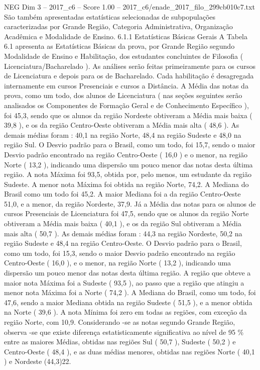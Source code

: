 \begin{textsample}{NEG Dim 3 – 2017\_c6 – Score 1.00 – 2017\_c6/enade\_2017\_filo\_299cb010c7.txt}
São também apresentadas estatísticas selecionadas de subpopulações caracterizadas por Grande Região, Categoria Administrativa, Organização Acadêmica e Modalidade de Ensino. 6.1.1 Estatísticas Básicas Gerais A Tabela 6.1 apresenta as Estatísticas Básicas da prova, por Grande Região segundo Modalidade de Ensino e Habilitação, dos estudantes concluintes de Filosofia ( Licenciatura/Bacharelado ).
As análises serão feitas primeiramente para os cursos de Licenciatura e depois para os de Bacharelado.
Cada habilitação é desagregada internamente em cursos Presenciais e cursos a Distância.
A Média das notas da prova, como um todo, dos alunos de Licenciatura ( nas seções seguintes serão analisados os Componentes de Formação Geral e de Conhecimento Específico ), foi 45,3, sendo que os alunos da região Nordeste obtiveram a Média mais baixa ( 39,8 ), e os da região Centro-Oeste obtiveram a Média mais alta ( 48,6 ).
As demais médias foram : 40,1 na região Norte, 48,4 na região Sudeste e 48,0 na região Sul.
O Desvio padrão para o Brasil, como um todo, foi 15,7, sendo o maior Desvio padrão encontrado na região Centro-Oeste ( 16,0 ) e o menor, na região Norte ( 13,2 ), indicando uma dispersão um pouco menor das notas desta última região.
A nota Máxima foi 93,5, obtida por, pelo menos, um estudante da região Sudeste.
A menor nota Máxima foi obtida na região Norte, 74,2.
A Mediana do Brasil como um todo foi 45,2.
A maior Mediana foi a da região Centro-Oeste 51,0, e a menor, da região Nordeste, 37,9.
Já a Média das notas para os alunos de cursos Presenciais de Licenciatura foi 47,5, sendo que os alunos da região Norte obtiveram a Média mais baixa ( 40,1 ), e os da região Sul obtiveram a Média mais alta ( 50,7 ).
As demais médias foram : 44,3 na região Nordeste, 50,2 na região Sudeste e 48,4 na região Centro-Oeste.
O Desvio padrão para o Brasil, como um todo, foi 15,3, sendo o maior Desvio padrão encontrado na região Centro-Oeste ( 16,0 ), e o menor, na região Norte ( 13,2 ), indicando uma dispersão um pouco menor das notas desta última região.
A região que obteve a maior nota Máxima foi a Sudeste ( 93,5 ), ao passo que a região que atingiu a menor nota Máxima foi a Norte ( 74,2 ).
A Mediana do Brasil, como um todo, foi 47,6, sendo a maior Mediana obtida na região Sudeste ( 51,5 ), e a menor obtida na Norte ( 39,6 ).
A nota Mínima foi zero em todas as regiões, com exceção da região Norte, com 10,9.
Considerando -se as notas segundo Grande Região, observa -se que existe diferença estatisticamente significativa ao nível de 95 \% entre as maiores Médias, obtidas nas regiões Sul ( 50,7 ), Sudeste ( 50,2 ) e Centro-Oeste ( 48,4 ), e as duas médias menores, obtidas nas regiões Norte ( 40,1 ) e Nordeste (44,3)22.

\end{textsample}
